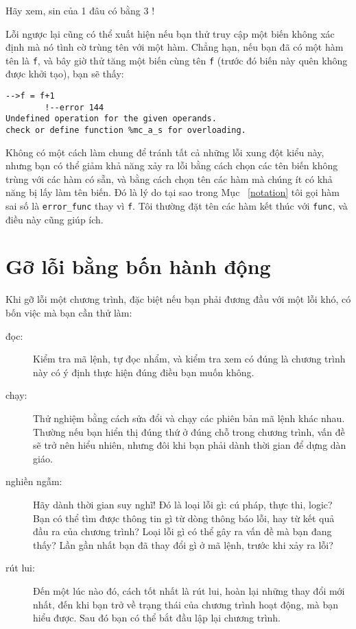 \documentclass[12pt]{book}
\begin{document}
Hãy xem, sin của 1 đâu có bằng 3 !

Lỗi ngược lại cũng có thể xuất hiện nếu bạn thử truy cập một biến
không xác định mà nó tình cờ trùng tên với một hàm. Chẳng hạn, nếu
bạn đã có một hàm tên là {\tt f}, và bây giờ thử tăng một biến
cùng tên {\tt f} (trước đó biến này quên không được khởi tạo), bạn
sẽ thấy:

\begin{verbatim}
-->f = f+1
        !--error 144 
Undefined operation for the given operands.
check or define function %mc_a_s for overloading.
\end{verbatim}

%
%

Không có một cách làm chung để tránh tất cả những lỗi xung đột
kiểu này, nhưng bạn có thể giảm khả năng xảy ra lỗi bằng cách chọn
các tên biến không trùng với các hàm có sẵn, và bằng cách chọn tên
các hàm mà chúng ít có khả năng bị lấy làm tên biến. Đó là lý do
tại sao trong Mục~ \ref{notation} tôi gọi hàm sai số là
\verb#error_func# thay vì {\tt f}.  Tôi thường đặt tên các hàm
kết thúc với {\tt func}, và điều này cũng giúp ích.


\section{Gỡ lỗi bằng bốn hành động}

Khi gỡ lỗi một chương trình, đặc biệt nếu bạn phải đương đầu với
một lỗi khó, có bốn việc mà bạn cần thử làm:

\begin{description}

\item[đọc:] Kiểm tra mã lệnh, tự đọc nhẩm, và kiểm tra xem có đúng
là chương trình này có ý định thực hiện đúng điều bạn muốn không.

\item[chạy:] Thử nghiệm bằng cách sửa đổi và chạy các phiên bản mã lệnh
khác nhau. Thường nếu bạn hiển thị đúng thứ ở đúng chỗ trong chương
trình, vấn đề sẽ trở nên hiểu nhiên, nhưng đôi khi bạn phải dành 
thời gian để dựng dàn giáo.

\item[nghiền ngẫm:] Hãy dành thời gian suy nghĩ! Đó là loại lỗi gì:
cú pháp, thực thi, logic? Bạn có thể tìm được thông tin gì từ dòng
thông báo lỗi, hay từ kết quả đầu ra của chương trình? Loại lỗi gì
có thể gây ra vấn đề mà bạn đang thấy? Lần gần nhất bạn đã thay đổi
gì ở mã lệnh, trước khi xảy ra lỗi?

\item[rút lui:] Đến một lúc nào đó, cách tốt nhất là rút lui, hoàn lại
những thay đổi mới nhất, đến khi bạn trở về trạng thái của chương
trình hoạt động, mà bạn hiểu được. Sau đó bạn có thể bắt đầu lập
lại chương trình.

\end{description}
\end{document}
